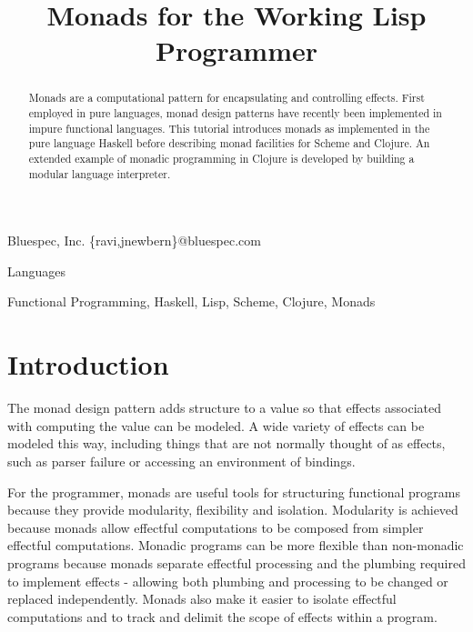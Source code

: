 \documentclass[natbib,10pt]{sigplanconf}
\begin{document}
\copyrightdata{[to be supplied]}
\toappear{}


\title{Monads for the Working Lisp Programmer}

           {Bluespec, Inc.}
           {\{ravi,jnewbern\}@bluespec.com}

\maketitle

\begin{abstract}

Monads are a computational pattern for encapsulating and controlling
effects.  First employed in pure languages, monad design patterns have
recently been implemented in impure functional languages.  This
tutorial introduces monads as implemented in the pure language Haskell
before describing monad facilities for Scheme and Clojure.  An extended
example of monadic programming in Clojure is developed by building a
modular language interpreter.

\end{abstract}


\terms
Languages

\keywords
Functional Programming, Haskell, Lisp, Scheme, Clojure, Monads


\section{Introduction}

The monad design pattern adds structure to a value so that effects
associated with computing the value can be modeled.  A wide variety of
effects can be modeled this way, including things that are not
normally thought of as effects, such as parser failure or accessing an
environment of bindings.

For the programmer, monads are useful tools for structuring functional
programs because they provide modularity, flexibility and isolation.
Modularity is achieved because monads allow effectful computations to
be composed from simpler effectful computations. Monadic programs can be
more flexible than non-monadic programs because monads separate 
effectful processing and the plumbing required to implement effects - 
allowing both plumbing and processing to be changed or replaced
independently. Monads also make it easier to isolate effectful 
computations and to track and delimit the scope of effects within a 
program.
\end{document}
